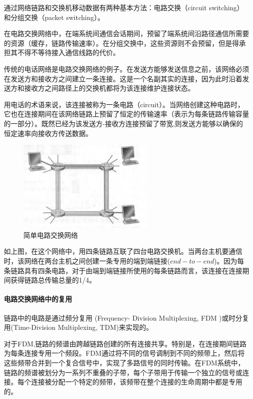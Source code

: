     通过网络链路和交换机移动数据有两种基本方法：电路交换（circuit switching）和分组交换（packet switching）。

    在电路交换网络中，在端系统间通信会话期间，预留了端系统间沿路径通信所需要的资源（缓存，链路传输速率）。在分组交换中，这些资源则不会预留，但是得承担其不得不等待接入通信线路的代价。

    传统的电话网络是电路交换网络的例子。在发送方能够发送信息之前，该网络必须在发送方和接收方之间建立一条连接。这是一个名副其实的连接，因为此时沿着发送方和接收方之间路径上的交换机都将为该连接维护连接状态。
    
    用电话的术语来说，该连接被称为一条电路（circuit）。当网络创建这种电路时，它也在连接期间在该网络链路上预留了恒定的传输速率（表示为每条链路传输容量的一部分）。既然已经为该发送方-接收方连接预留了带宽,则发送方能够以确保的恒定速率向接收方传送数据。

\begin{figure}[!htbp]
    \centering
    \includegraphics[width=0.6\textwidth]{image/chapter01/电路交换.png}
    \caption{简单电路交换网络}
\end{figure}

    如上图，在这个网络中，用四条链路互联了四台电路交换机。当两台主机要通信时，该网络在两台主机之间创建一条专用的端到端链接($end-to-end$)。因为每条链路具有四条电路，对于由端到端链接所使用的每条链路而言，该连接在连接期间获得链路总传输总量的1/4。

\paragraph{电路交换网络中的复用}

    链路中的电路是通过频分复用 (Frequency- Division Multiplexing, FDM )或时分复用(Time-Division Multiplexing, TDM)来实现的。

    对于FDM,链路的频谱由跨越链路创建的所有连接共享。特别是，在连接期间链路为每条连接专用一个频段。FDM通过将不同的信号调制到不同的频带上，然后将这些频带合并到一个复合信号中，实现了多路信号的同时传输。在FDM系统中，链路的频谱被划分为一系列不重叠的子带，每个子带用于传输一个独立的信号或连接。每个连接被分配一个特定的频带，该频带在整个连接的生命周期中都是专用的。

